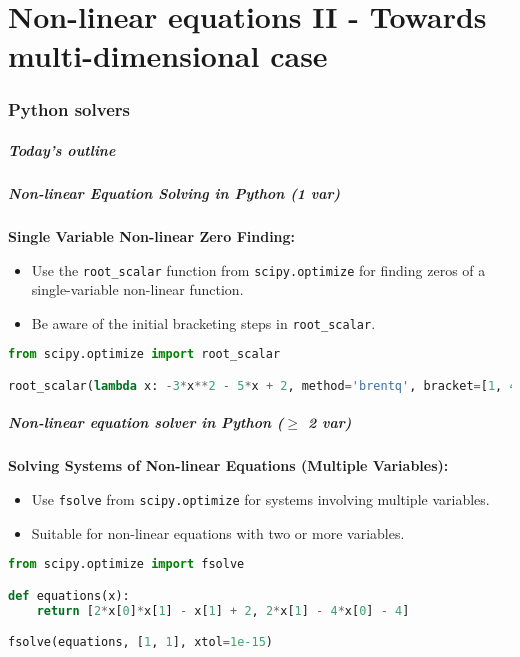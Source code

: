 \part{Non-linear equations II - Towards multi-dimensional case}
\section{Python solvers}
\begin{frame}[label=contents_integration]
  \frametitle{Today's outline}
\end{frame}
\begin{frame}[fragile]
  \frametitle{Non-linear Equation Solving in Python (1 var)}

  \textbf{Single Variable Non-linear Zero Finding:}
  \begin{itemize}
      \item Use the \texttt{root\_scalar} function from \texttt{scipy.optimize} for finding zeros of a single-variable non-linear function.
      \item Be aware of the initial bracketing steps in \texttt{root\_scalar}.
  \end{itemize}

  \begin{lstlisting}[language=Python]
from scipy.optimize import root_scalar

root_scalar(lambda x: -3*x**2 - 5*x + 2, method='brentq', bracket=[1, 4], xtol=1e-15)
  \end{lstlisting}
  
\end{frame}


\begin{frame}[fragile]
  \frametitle{Non-linear equation solver in Python ($\geq$ 2 var)}

  \textbf{Solving Systems of Non-linear Equations (Multiple Variables):}
  \begin{itemize}
      \item Use \texttt{fsolve} from \texttt{scipy.optimize} for systems involving multiple variables.
      \item Suitable for non-linear equations with two or more variables.
  \end{itemize}
  \begin{lstlisting}[language=Python]
from scipy.optimize import fsolve

def equations(x):
    return [2*x[0]*x[1] - x[1] + 2, 2*x[1] - 4*x[0] - 4]

fsolve(equations, [1, 1], xtol=1e-15)
    \end{lstlisting}
\end{frame}


